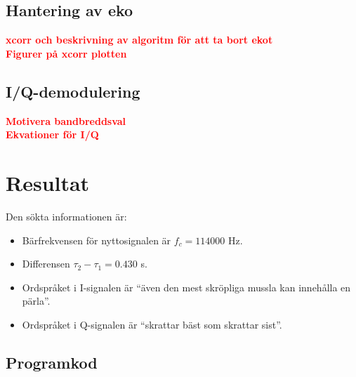 \documentclass[10pt,twocolumn]{article}
\newcommand{\todo}[1]{\textbf{\textcolor{red}{#1}}}
\begin{document}
\subsection{Hantering av eko}
\todo{xcorr och beskrivning av algoritm för att ta bort ekot} \\
\todo{Figurer på xcorr plotten} \\

\subsection{I/Q-demodulering}
\todo{Motivera bandbreddsval} \\
\todo{Ekvationer för I/Q} \\

\section{Resultat}

Den sökta informationen är:

\begin{itemize}
\item Bärfrekvensen för nyttosignalen är $f_c = 114000$ Hz.
\item Differensen $\tau_{2} - \tau_{1} = 0.430$ s.
\item Ordspråket i I-signalen är ``även den mest skröpliga mussla kan innehålla en pärla''.
\item Ordspråket i Q-signalen är ``skrattar bäst som skrattar sist''.
\end{itemize}

\clearpage

\begin{appendices}
\section{Programkod}

\end{appendices}
\end{document}
